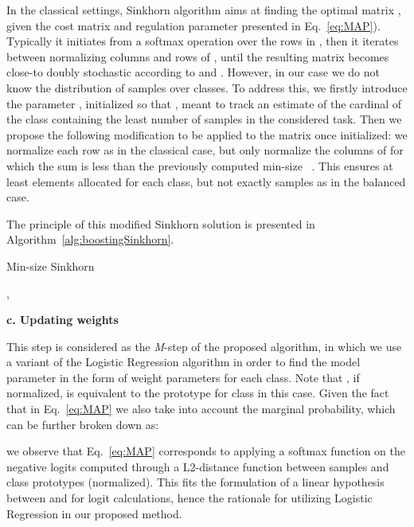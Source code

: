 \documentclass[review]{elsarticle}
\begin{document}
In the classical settings, Sinkhorn algorithm aims at finding the optimal matrix , given the cost matrix  and regulation parameter  presented in Eq.~\ref{eq:MAP}). Typically it initiates  from a softmax operation over the rows in , then it iterates between normalizing columns and rows of , until the resulting matrix becomes close-to doubly stochastic according to  and . However, in our case we do not know the distribution of samples over classes. To address this, we firstly introduce the parameter , initialized so that , meant to track an estimate of the cardinal of the class containing the least number of samples in the considered task. Then we propose the following modification to be applied to the matrix  once initialized: we normalize each row as in the classical case, but only normalize the columns of  for which the sum is less than the previously computed min-size ~\cite{lichtenstein2020tafssl}. This ensures at least  elements allocated for each class, but not exactly  samples as in the balanced case. 

The principle of this modified Sinkhorn solution is presented in Algorithm~\ref{alg:boostingSinkhorn}.

\begin{algorithm}[tb]
   \caption{Min-size Sinkhorn}
   \label{alg:boostingSinkhorn}
\begin{algorithmic}
    {, }
    {}
   \STATE 
   \STATE 
\ENDFOR
   
\end{algorithmic}
\end{algorithm}

\textbf{c. Updating weights}

This step is considered as the \emph{M}-step of the proposed algorithm, in which we use a variant of the Logistic Regression algorithm in order to find the model parameter  in the form of weight parameters  for each class. Note that , if normalized, is equivalent to the prototype for class  in this case. Given the fact that in Eq.~\ref{eq:MAP} we also take into account the marginal probability, which can be further broken down as:

we observe that Eq.~\ref{eq:MAP} corresponds to applying a softmax function on the negative logits computed through a L2-distance function between samples and class prototypes (normalized). This fits the formulation of a linear hypothesis between  and  for logit calculations, hence the rationale for utilizing Logistic Regression in our proposed method.    
\end{document}
